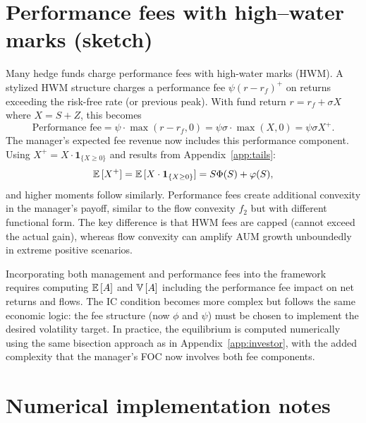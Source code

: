 \section{Performance fees with high–water marks (sketch)}
\label{app:perf-fee}
Many hedge funds charge performance fees with high-water marks (HWM). A stylized HWM structure charges a performance fee $\psi(r-r_f)^+$ on returns exceeding the risk-free rate (or previous peak). With fund return $r=r_f+\sigma X$ where $X=S+Z$, this becomes
\[
\text{Performance fee} = \psi\cdot\max(r-r_f, 0) = \psi\sigma\cdot\max(X, 0) = \psi\sigma X^+.
\]
The manager's expected fee revenue now includes this performance component. Using $X^+ = X\cdot\mathbf{1}_{\{X\ge 0\}}$ and results from Appendix~\ref{app:tails}:
\[
{\mathbb{E}}\,[X^+] = {\mathbb{E}}\,[X\cdot\mathbf{1}_{\{X\ge 0\}}] = S\Phi(S) + \varphi(S),
\]
and higher moments follow similarly. Performance fees create additional convexity in the manager's payoff, similar to the flow convexity $f_2$ but with different functional form. The key difference is that HWM fees are capped (cannot exceed the actual gain), whereas flow convexity can amplify AUM growth unboundedly in extreme positive scenarios.

Incorporating both management and performance fees into the framework requires computing ${\mathbb{E}}\,[A]$ and ${\mathbb{V}}\,[A]$ including the performance fee impact on net returns and flows. The IC condition becomes more complex but follows the same economic logic: the fee structure (now $\phi$ and $\psi$) must be chosen to implement the desired volatility target. In practice, the equilibrium is computed numerically using the same bisection approach as in Appendix~\ref{app:investor}, with the added complexity that the manager's FOC now involves both fee components.

\section{Numerical implementation notes}
\label{app:numerical}

